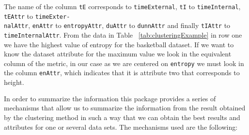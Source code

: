 The name of the column \texttt{tE} corresponds to \texttt{timeExternal}, \texttt{tI} to \texttt{timeInternal}, \texttt{tEAttr} to \texttt{timeExter-}\\
\texttt{nalAttr}, \texttt{enAttr} to \texttt{entropyAttr}, \texttt{duAttr} to \texttt{dunnAttr} and finally \texttt{tIAttr} to \texttt{timeInternalAttr}. From the data in Table ~\ref{tab:clusteringExample} in row one we have the highest value of entropy for the basketball dataset. If we want to know the dataset attribute for the maximum value we look in the equivalent column of the metric, in our case as we are centered on \texttt{entropy} we must look in the column \texttt{enAttr}, which indicates that it is attribute two that corresponds to height.

In order to summarize the information this package provides a series of mechanisms that allow us to summarize the information from the result obtained by the clustering method in such a way that we can obtain the best results and attributes for one or several data sets. The mechanisms used are the following:

